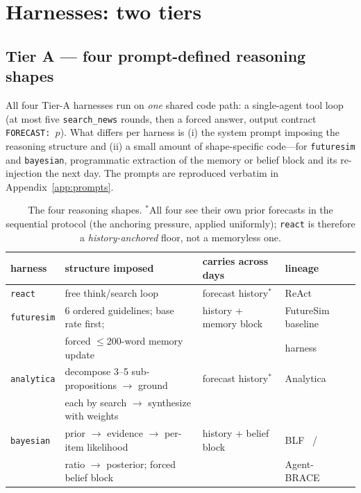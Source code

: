 \documentclass[10pt]{article}
\newcommand{\hr}[1]{\texttt{#1}}
\begin{document}
\section{Harnesses: two tiers}\label{sec:harness}
\subsection{Tier A --- four prompt-defined reasoning shapes}\label{sec:tierA}
All four Tier-A harnesses run on \emph{one} shared code path: a single-agent tool loop (at most
five \texttt{search\_news} rounds, then a forced answer, output contract
\texttt{FORECAST:\,$p$}). What differs per harness is (i) the system prompt imposing the reasoning
structure and (ii) a small amount of shape-specific code---for \hr{futuresim} and \hr{bayesian},
programmatic extraction of the memory or belief block and its re-injection the next day. The
prompts are reproduced verbatim in Appendix~\ref{app:prompts}.

\begin{table}[htbp]\centering\small
\begin{tabular}{@{}llll@{}}
\toprule
harness & structure imposed & carries across days & lineage \\
\midrule
\hr{react} & free think/search loop & forecast history$^{\ast}$ & ReAct~\cite{react} \\
\hr{futuresim} & 6 ordered guidelines; base rate first; & history + memory block & FutureSim
baseline \\
 & forced $\le$200-word memory update & & harness~\cite{futuresim} \\
\hr{analytica} & decompose 3--5 sub-propositions $\to$ ground & forecast history$^{\ast}$ &
Analytica~\cite{analytica} \\
 & each by search $\to$ synthesize with weights & & \\
\hr{bayesian} & prior $\to$ evidence $\to$ per-item likelihood & history + belief block &
BLF~\cite{blf} / \\
 & ratio $\to$ posterior; forced belief block & & Agent-BRACE~\cite{agentbrace} \\
\bottomrule
\end{tabular}
\caption{The four reasoning shapes. $^{\ast}$All four see their own prior forecasts in the
sequential protocol (the anchoring pressure, applied uniformly); \hr{react} is therefore a
\emph{history-anchored} floor, not a memoryless one.}
\label{tab:harness}
\end{table}
\end{document}
